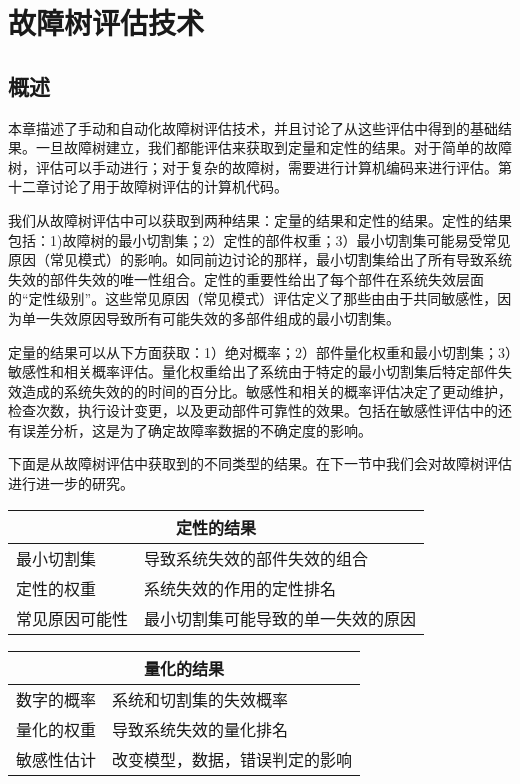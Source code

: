 \documentclass[cn,11pt,chinese]{elegantbook}
\begin{document}
{\chapter{故障树评估技术}

\section{概述}

本章描述了手动和自动化故障树评估技术，并且讨论了从这些评估中得到的基础结果。一旦故障树建立，我们都能评估来获取到定量和定性的结果。对于简单的故障树，评估可以手动进行；对于复杂的故障树，需要进行计算机编码来进行评估。第十二章讨论了用于故障树评估的计算机代码。

我们从故障树评估中可以获取到两种结果：定量的结果和定性的结果。定性的结果包括：1)故障树的最小切割集；2）定性的部件权重；3）最小切割集可能易受常见原因（常见模式）的影响。如同前边讨论的那样，最小切割集给出了所有导致系统失效的部件失效的唯一性组合。定性的重要性给出了每个部件在系统失效层面的“定性级别”。这些常见原因（常见模式）评估定义了那些由由于共同敏感性，因为单一失效原因导致所有可能失效的多部件组成的最小切割集。

定量的结果可以从下方面获取：1）绝对概率；2）部件量化权重和最小切割集；3）敏感性和相关概率评估。量化权重给出了系统由于特定的最小切割集后特定部件失效造成的系统失效的的时间的百分比。敏感性和相关的概率评估决定了更动维护，检查次数，执行设计变更，以及更动部件可靠性的效果。包括在敏感性评估中的还有误差分析，这是为了确定故障率数据的不确定度的影响。

下面是从故障树评估中获取到的不同类型的结果。在下一节中我们会对故障树评估进行进一步的研究。

\begin{table}[]
	\centering
	\begin{tabular}{@{}ll@{}}
		\toprule
		\multicolumn{2}{c}{\textbf{定性的结果}} \\ \midrule
		最小切割集       & 导致系统失效的部件失效的组合       \\
		定性的权重       & 系统失效的作用的定性排名         \\
		常见原因可能性     & 最小切割集可能导致的单一失效的原因    \\ \bottomrule
	\end{tabular}
\end{table}
\begin{table}[]
	\centering
	\begin{tabular}{@{}ll@{}}
		\toprule
		\multicolumn{2}{c}{\textbf{量化的结果}} \\ \midrule
		数字的概率       & 系统和切割集的失效概率          \\
		量化的权重       & 导致系统失效的量化排名          \\
		敏感性估计       & 改变模型，数据，错误判定的影响      \\ \bottomrule
	\end{tabular}
\end{table}

}
\end{document}
